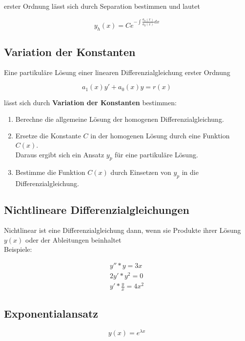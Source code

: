 \message{ !name(Mathe2Formelsammlung.tex)}\documentclass[8pt, a4paper]{article}
\begin{document}
erster Ordnung lässt sich durch Separation bestimmen und lautet

\[
  y_h(x)=Ce^{-\int{\frac{a_o(x)}{a_y(x)}dx}}
\]

\subsection{Variation der Konstanten}

Eine partikuläre Lösung einer linearen Differenzialgleichung erster Ordnung

\[
  a_1(x)y'+a_0(x)y=r(x)
\]

lässt sich durch \textbf{Variation der Konstanten} bestimmen:

\begin{enumerate}
\item Berechne die allgemeine Lösung der homogenen Differenzialgleichung.
\item Ersetze die Konstante \(C\) in der homogenen Lösung durch eine Funktion \(C(x)\).\\
  Daraus ergibt sich ein Ansatz \(y_p\) für eine partikuläre Lösung.
\item Bestimme die Funktion \(C(x)\) durch Einsetzen von \(y_p\) in die Differenzialgleichung.
\end{enumerate}

\subsection{Nichtlineare Differenzialgleichungen}

Nichtlinear ist eine Differenzialgleichung dann, wenn sie Produkte ihrer Lösung \(y(x)\) oder der Ableitungen beinhaltet\\
Beispiele:

\[
  \begin{split}
    y''*y=3x\\
    2y'*y^2=0\\
    y'*\frac{y}{x}=4x^2
  \end{split}
\]

\subsection{Exponentialansatz}

\[
  y(x)=e^{\lambda x}
\]
\end{document}
